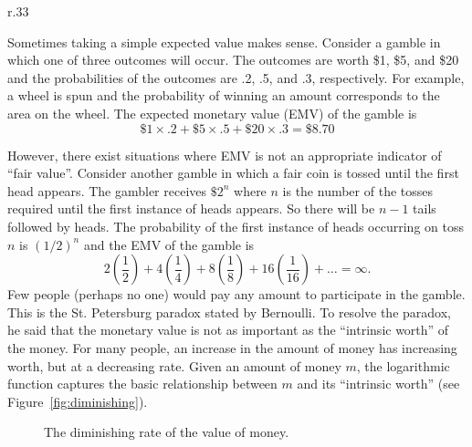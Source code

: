 \begin{wrapfigure}{r}{.33\textwidth}
\centering
{}
\end{wrapfigure}

Sometimes taking a simple expected value makes sense.  Consider a
gamble in which one of three outcomes will occur. The outcomes are
worth \$1, \$5, and \$20 and the probabilities of the outcomes are .2,
.5, and .3, respectively. For example, a wheel is spun and the
probability of winning an amount corresponds to the area on the wheel.
The expected monetary value (EMV) of the gamble is
\[ \$1 \times .2 + \$5 \times .5 + \$20 \times .3 = \$8.70 \]

However, there exist situations where EMV is not an appropriate
indicator of ``fair value''. Consider another gamble in which a fair
coin is tossed until the first head appears. The gambler receives
$\$2^n$ where $n$ is the number of the tosses required until the first
instance of heads appears. So there will be $n-1$ tails followed by
heads. The probability of the first instance of heads occurring on
toss $n$ is $(1/2)^n$ and the EMV of the gamble is
\[
  2\left(\frac{1}{2}\right) + 4\left(\frac{1}{4}\right) + 8\left(\frac{1}{8}\right) +
  16\left(\frac{1}{16}\right) + \ldots = \infty.
\]
Few people (perhaps no one) would pay any amount to participate in the
gamble.  This is the St. Petersburg paradox stated by Bernoulli. To
resolve the paradox, he said that the monetary value is not as
important as the ``intrinsic worth'' of the money. For many people, an
increase in the amount of money has increasing worth, but at a
decreasing rate. Given an amount of money $m$, the logarithmic
function captures the basic relationship between $m$ and its
``intrinsic worth'' (see Figure~\vref{fig:diminishing}).

\begin{figure}
\centering
{}
\caption{The diminishing rate of the value of money.}
\label{fig:diminishing}
\end{figure}

